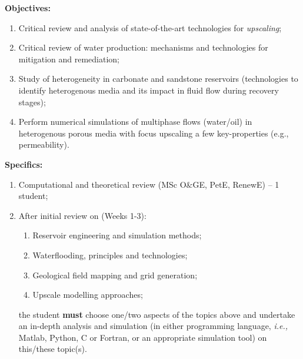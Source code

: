 \documentclass[12pts,a4paper,amsmath,amssymb,floatfix]{article}%
\newcommand{\MSc}{MSc O$\&$GE, PetE, RenewE}
\newcommand{\ie}{{\it i.e., }}
\begin{document}
\begin{enumerate}[label=\bfseries Project: \arabic*:]
\noindent
{\bf Objectives:}
\begin{enumerate}
\item Critical review and analysis of state-of-the-art technologies for {\it upscaling};
\item Critical review of water production: mechanisms and technologies for mitigation and remediation;
\item Study of heterogeneity in carbonate and sandstone reservoirs (technologies to identify heterogenous media and its impact in fluid flow during recovery stages);
\item Perform numerical simulations of multiphase flows (water/oil) in heterogenous porous media with focus upscaling a few key-properties (e.g., permeability).  
\end{enumerate}

\noindent
{\bf Specifics:} 
\begin{enumerate}
\item Computational and theoretical review (\MSc) -- 1 student;
\item After initial review on (Weeks 1-3):
   \begin{enumerate}
       \item Reservoir engineering and simulation methods;
       \item Waterflooding, principles and technologies;
       \item Geological field mapping and grid generation;
       \item Upscale modelling approaches;
   \end{enumerate}
the student {\bf must} choose one/two aspects of the topics above and undertake an in-depth analysis and simulation (in either programming language, \ie Matlab, Python, C or Fortran, or an appropriate simulation tool) on this/these topic(s).
\end{enumerate}



\end{enumerate}
\end{document}
